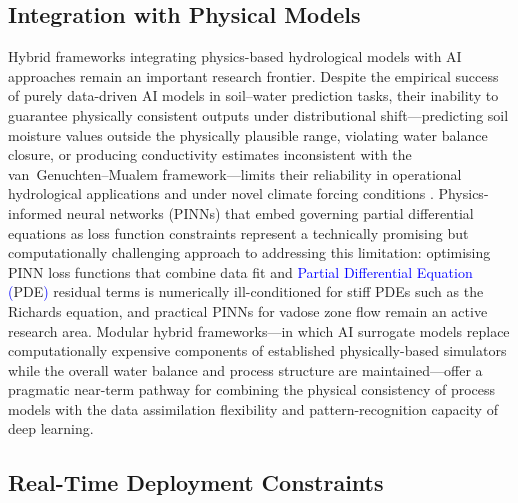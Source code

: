 \documentclass[land,article,submit,pdftex,moreauthors]{Definitions/mdpi}
\numberwithin{equation}{section}
\begin{document}
\subsection{Integration with Physical Models}

Hybrid frameworks integrating physics-based hydrological models with AI approaches remain an important research frontier. Despite the empirical success of purely data-driven AI models in soil--water prediction tasks, their inability to guarantee physically consistent outputs under distributional shift---predicting soil moisture values outside the physically plausible range, violating water balance closure, or producing conductivity estimates inconsistent with the van~Genuchten--Mualem framework---limits their reliability in operational hydrological applications and under novel climate forcing conditions \citep{willard2022integrating}. Physics-informed neural networks (PINNs) that embed governing partial differential equations as loss function constraints represent a technically promising but computationally challenging approach to addressing this limitation: optimising PINN loss functions that combine data fit and \textcolor{blue}{Partial Differential Equation (}PDE\textcolor{blue}{)} residual terms is numerically ill-conditioned for stiff PDEs such as the Richards equation, and practical PINNs for vadose zone flow remain an active research area. Modular hybrid frameworks---in which AI surrogate models replace computationally expensive components of established physically-based simulators while the overall water balance and process structure are maintained---offer a pragmatic near-term pathway for combining the physical consistency of process models with the data assimilation flexibility and pattern-recognition capacity of deep learning.

\subsection{Real-Time Deployment Constraints}
\end{document}
